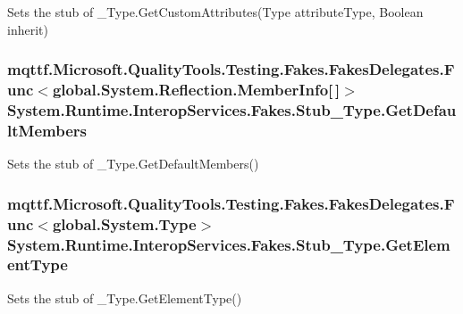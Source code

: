 Sets the stub of \-\_\-\-Type.\-Get\-Custom\-Attributes(\-Type attribute\-Type, Boolean inherit)

\hypertarget{class_system_1_1_runtime_1_1_interop_services_1_1_fakes_1_1_stub___type_ab937a43cfadc9e40a0bf9a4148a8e2c0}{
\subsubsection[{Get\-Default\-Members}]{\setlength{\rightskip}{0pt plus 5cm}mqttf.\-Microsoft.\-Quality\-Tools.\-Testing.\-Fakes.\-Fakes\-Delegates.\-Func$<$global.\-System.\-Reflection.\-Member\-Info\mbox{[}$\,$\mbox{]}$>$ System.\-Runtime.\-Interop\-Services.\-Fakes.\-Stub\-\_\-\-Type.\-Get\-Default\-Members}}\label{class_system_1_1_runtime_1_1_interop_services_1_1_fakes_1_1_stub___type_ab937a43cfadc9e40a0bf9a4148a8e2c0}


Sets the stub of \-\_\-\-Type.\-Get\-Default\-Members()

\hypertarget{class_system_1_1_runtime_1_1_interop_services_1_1_fakes_1_1_stub___type_a12fe9e89fe74f5a463ce2d8c87540722}{
\subsubsection[{Get\-Element\-Type}]{\setlength{\rightskip}{0pt plus 5cm}mqttf.\-Microsoft.\-Quality\-Tools.\-Testing.\-Fakes.\-Fakes\-Delegates.\-Func$<$global.\-System.\-Type$>$ System.\-Runtime.\-Interop\-Services.\-Fakes.\-Stub\-\_\-\-Type.\-Get\-Element\-Type}}\label{class_system_1_1_runtime_1_1_interop_services_1_1_fakes_1_1_stub___type_a12fe9e89fe74f5a463ce2d8c87540722}


Sets the stub of \-\_\-\-Type.\-Get\-Element\-Type()

